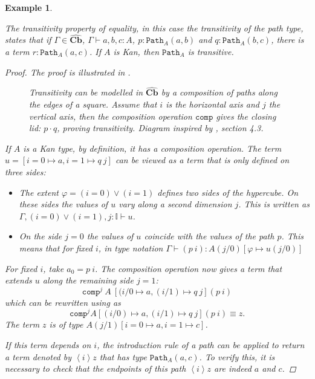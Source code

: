 \documentclass[12pt,a4paper,twoside,xetex]{book} %
\newcommand{\keyword}[1]{\emph{#1}\index{#1}}
\newtheorem{example}[theorem]{Example}
\newcommand{\psh}[1]{\widehat{#1}}
\newcommand{\op}[1]{\mathtt{#1}}
\newcommand{\cube}[0]{\textbf{Cb}}
\newcommand{\pa}[3]{\op{Path}_{#1}\left(#2, #3\right)}
\begin{document}
\begin{example}\label{pathtransitivity}

The \keyword{transitivity} property of equality, in this case the transitivity of the path type, 
states that if $\Gamma \in \psh{\cube}$, $\Gamma \vdash a,b,c : A$, $p: \op{Path}_A(a,b)$ and $q: 
\op{Path}_A(b,c)$, there is a term $r : \op{Path}_A(a,c)$. If $A$ is Kan, then 
$\op{Path}_A$ is transitive.	

\begin{proof}
The proof is illustrated in .

\begin{figure}\label{transdiag}

\caption{Transitivity can be modelled in $\psh{\cube}$ by a  composition 
of paths along the edges of a square. Assume that $i$ is the horizontal axis and   $j$ the vertical axis, then the composition operation $\texttt{comp}$ gives the closing lid: $p \cdot q$, proving transitivity. Diagram inspired by \cite{Cohen2016}, 
section 4.3.}
\end{figure}

If $A$ is a Kan type, by definition, it has a composition operation. The 
term $u = [i=0 \mapsto a, i=1 \mapsto q\ j]$ can be viewed as a 
term that is only defined on three sides:

\begin{itemize}
\item The extent $\varphi = (i=0) \vee (i=1)$ defines two sides of the 
hypercube. On these sides the values of $u$ vary along a second dimension $j$. 
This is written as $\Gamma, (i=0)\vee (i=1), j : \mathbb{I} \vdash u$.
\item On the side $j=0$ the values of $u$ coincide with the values of the path 
$p$. This means that for fixed $i$, in type notation $\Gamma \vdash (p \  i) : 
A(j/0)[\varphi \mapsto u(j/0)]$

\end{itemize}

For fixed $i$, take $a_0 = p \  i$. The composition operation now gives a 
term that extends $u$ along the remaining side $j=1$: $$\op{comp}^j\ A\ [(i/0 
\mapsto a, (i/1) \mapsto q\ j] (p\ i)$$ which can be rewritten using  
 as $$\op{comp}^j A [(i/0) \mapsto a, (i/1) \mapsto q \ j] 
(p \  i) \equiv z.$$ The term $z$ is of type $A(j/1)[i=0 \mapsto a, i=1 \mapsto 
c]$.

If this term depends on $i$, the introduction rule of a 
path can be applied to return a term denoted by $\left< i \right> z$ that has 
type $\pa{A}{a}{c}$. To verify this, it is necessary to check that the endpoints 
of this path $\left< i \right> z$ are indeed $a$ and $c$.


\end{proof}
\end{example}
\end{document}
